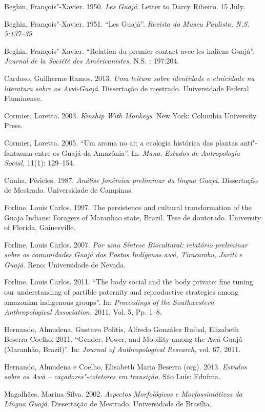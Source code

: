 \begin{Parskip}
Beghin, François"-Xavier. 1950. \emph{Les Guajá}. Letter to Darcy
Ribeiro. 15 July.

Beghin, François"-Xavier. 1951. ``Les Guajá''. \emph{Revista do Museu
Paulista, N.S. 5:137--39}

Beghin, François"-Xavier. ``Relation du premier contact avec les indiens
Guajá''. \emph{Journal de la Société des Américanistes,} N.S. :
197:204.

Cardoso, Guilherme Ramos. 2013. \emph{Uma leitura sobre identidade e
etnicidade na literatura sobre os Awá-Guajá}. Dissertação de mestrado.
Universidade Federal Fluminense.

Cormier, Loretta. 2003. \emph{Kinship With Monkeys}. New York: Columbia
University Press.

Cormier, Loretta. 2005. ``Um aroma no ar: a ecologia histórica das
plantas anti"-fantasma entre os Guajá da Amazônia''. In: \emph{Mana}.
\emph{Estudos de Antropologia Social,} 11(1): 129--154.

Cunha, Péricles. 1987. \emph{Análise fonêmica preliminar da língua
Guajá}. Dissertação de Mestrado. Universidade de Campinas.

Forline, Louis Carlos. 1997. The persistence and cultural transformation
of the Guaja Indians: Foragers of Maranhao state, Brazil. Tese de
doutorado. University of Florida, Gainesville.

Forline, Louis Carlos. 2007. \emph{Por uma Síntese Biocultural:
relatório preliminar sobre as comunidades Guajá dos Postos Indígenas
awá, Tiracambu, Juriti e Guajá.} Reno: Universidade de Nevada.

Forline, Louis Carlos. 2011. ``The body social and the body private: fine
tuning our understanding of partible paternity and reproductive
strategies among amazonian indigenous groups''. In: \emph{Proceedings of
the Southwestern Anthropological Association,} 2011, Vol. 5, Pp. 1--8.

Hernando, Almudena, Gustavo Politis, Alfredo González Ruibal, Elizabeth
Beserra Coelho. 2011. ``Gender, Power, and Mobility among the Awá-Guajá
(Maranhão, Brazil)''. In: \emph{Journal of Anthropological Research,}
vol. 67, 2011.

Hernando, Almudena e Coelho, Elisabeth Maria Beserra (org). 2013.
\emph{Estudos sobre os Awá -- caçadores"-coletores em transição.} São
Luís: Edufma.

Magalhães, Marina Silva. 2002. \emph{Aspectos Morfológicos e
Morfossintáticos da Língua Guajá}. Dissertação de Mestrado. Universidade
de Brasília.


\end{Parskip}

